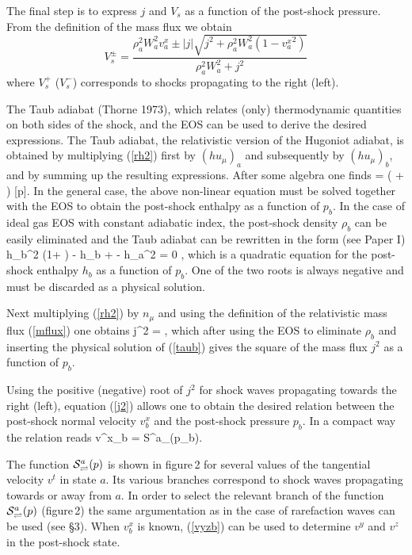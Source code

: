   The final step is to express $j$ and $V_s$ as a function of the post-shock 
pressure. From the definition of the mass flux we obtain
\begin{equation}
\displaystyle{
V_s^{\pm} = \frac{ \rho_a^2 W_a^2 v^x_a  \pm   
                   |j| \sqrt{j^2 + \rho_a^2 W_a^2 (1 -{v_a^x}^2)}
            }{ \rho_a^2 W_a^2 + j^2 }
}
\label{velshock}
\end{equation}
where $V_s^{+}$ ($V_s^{-}$) corresponds to shocks propagating to the
right (left). 

  The Taub adiabat (Thorne 1973), which relates (only) thermodynamic
quantities on both sides of the shock, and the EOS can be used to
derive the desired expressions. The Taub adiabat, the relativistic
version of the Hugoniot adiabat, is obtained by multiplying
(\ref{rh2}) first by $(h u_{\mu})_a$ and subsequently by $(h
u_{\mu})_b$, and by summing up the resulting expressions. After some
algebra one finds
\be
[ h^2 ] = \left(  +
 \right) [p].
\label{taub}
\ee
In the general case, the above non-linear equation must be solved together 
with the EOS to obtain the post-shock enthalpy as a function of 
$p_b$. In the case of ideal gas EOS with constant adiabatic index,
the post-shock density $\rho_b$ can be easily eliminated 
and the Taub adiabat can be rewritten in the form (see Paper I)
\be
h_b^2 \left(1+ \right)
 -  h_b +
 - h_a^2 = 0   \; ,
\label{h2}
\ee
which is a quadratic equation for the post-shock enthalpy $h_b$ as a
function of $p_b$. One of the two roots is always negative and must be
discarded as a physical solution.

Next multiplying (\ref{rh2}) by
$n_{\mu}$ and using the definition of the relativistic mass flux
(\ref{mflux}) one obtains
\be
j^2 = \frac{-[p]}{[h/\rho]},
\label{j2}
\ee
which after using the EOS to eliminate $\rho_b$ and inserting the
physical solution of (\ref{taub}) gives the square of the mass
flux $j^2$ as a function of $p_b$.

Using the positive (negative) root
of $j^2$ for shock waves propagating towards the right (left),
equation (\ref{j2}) allows one to obtain the desired relation between
the post-shock normal velocity $v^x_b$ and the post-shock pressure
$p_b$. In a compact way the relation reads
\be
v^x_b = {\cal S}^a_{\rightleftharpoons}(p_b).
\ee

  The function ${\cal S}^a_{\rightleftharpoons}(p)$ is shown in
figure\,2 for several values of the tangential velocity $v^t$ in state
$a$. Its various branches correspond to shock waves propagating
towards or away from $a$. In order to select the relevant branch of
the function ${\cal S}^a_{\rightleftharpoons}(p)$ (figure\,2) the same
argumentation as in the case of rarefaction waves can be used (see
\S3). When $v^x_b$ is known, (\ref{vyzb}) can be used to determine
$v^y$ and $v^z$ in the post-shock state.
 
